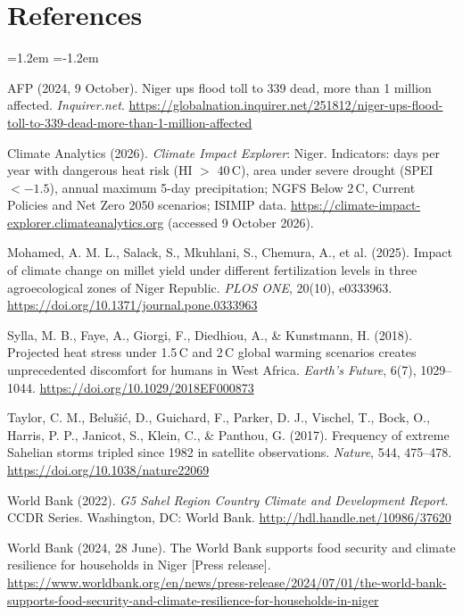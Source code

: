\documentclass[10pt,a4paper]{article}
\newcommand{\degC}{\,\textdegree C}
\begin{document}
\section{References}
{\small
\begin{list}{}{\leftmargin=1.2em \itemindent=-1.2em \itemsep=4pt \parsep=0pt}
\item AFP (2024, 9 October). Niger ups flood toll to 339 dead, more than 1 million affected.
      \emph{Inquirer.net}. \url{https://globalnation.inquirer.net/251812/niger-ups-flood-toll-to-339-dead-more-than-1-million-affected}
\item Climate Analytics (2026). \emph{Climate Impact Explorer}: Niger. Indicators: days per year with
      dangerous heat risk (HI $>$ 40\degC), area under severe drought (SPEI $< -1.5$), annual maximum
      5-day precipitation; NGFS Below 2\degC, Current Policies and Net Zero 2050 scenarios; ISIMIP data.
      \url{https://climate-impact-explorer.climateanalytics.org} (accessed 9 October 2026).
\item Mohamed, A. M. L., Salack, S., Mkuhlani, S., Chemura, A., et al. (2025). Impact of climate change on
      millet yield under different fertilization levels in three agroecological zones of Niger Republic.
      \emph{PLOS ONE}, 20(10), e0333963. \url{https://doi.org/10.1371/journal.pone.0333963}
\item Sylla, M. B., Faye, A., Giorgi, F., Diedhiou, A., \& Kunstmann, H. (2018). Projected heat stress
      under 1.5\degC{} and 2\degC{} global warming scenarios creates unprecedented discomfort for humans in
      West Africa. \emph{Earth's Future}, 6(7), 1029--1044. \url{https://doi.org/10.1029/2018EF000873}
\item Taylor, C. M., Belu\v{s}i\'{c}, D., Guichard, F., Parker, D. J., Vischel, T., Bock, O., Harris, P. P.,
      Janicot, S., Klein, C., \& Panthou, G. (2017). Frequency of extreme Sahelian storms tripled since 1982
      in satellite observations. \emph{Nature}, 544, 475--478. \url{https://doi.org/10.1038/nature22069}
\item World Bank (2022). \emph{G5 Sahel Region Country Climate and Development Report}. CCDR Series.
      Washington, DC: World Bank. \url{http://hdl.handle.net/10986/37620}
\item World Bank (2024, 28 June). The World Bank supports food security and climate resilience for households
      in Niger [Press release].
      \url{https://www.worldbank.org/en/news/press-release/2024/07/01/the-world-bank-supports-food-security-and-climate-resilience-for-households-in-niger}
\end{list}}
\end{document}
